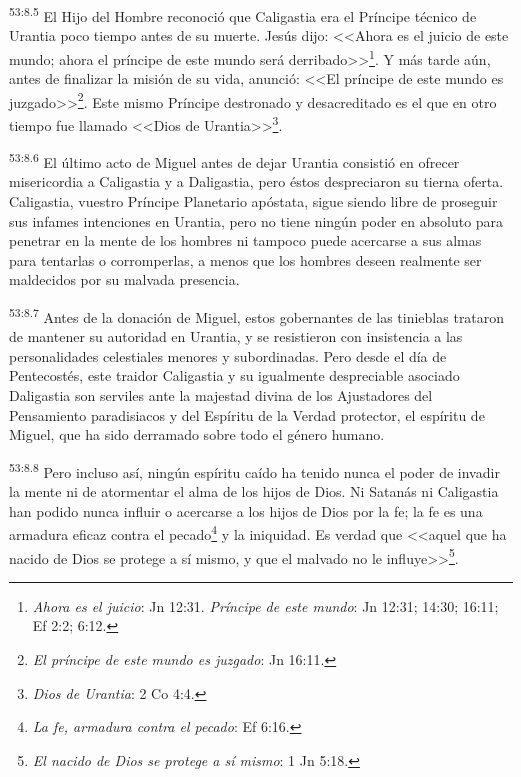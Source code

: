 \par
\textsuperscript{53:8.5} El Hijo del Hombre reconoció que Caligastia era el Príncipe técnico de Urantia poco tiempo antes de su muerte. Jesús dijo: <<Ahora es el juicio de este mundo; ahora el príncipe de este mundo será derribado>>\footnote{\textit{Ahora es el juicio}: Jn 12:31. \textit{Príncipe de este mundo}: Jn 12:31; 14:30; 16:11; Ef 2:2; 6:12.}. Y más tarde aún, antes de finalizar la misión de su vida, anunció: <<El príncipe de este mundo es juzgado>>\footnote{\textit{El príncipe de este mundo es juzgado}: Jn 16:11.}. Este mismo Príncipe destronado y desacreditado es el que en otro tiempo fue llamado <<Dios de Urantia>>\footnote{\textit{Dios de Urantia}: 2 Co 4:4.}.

\par
\textsuperscript{53:8.6} El último acto de Miguel antes de dejar Urantia consistió en ofrecer misericordia a Caligastia y a Daligastia, pero éstos despreciaron su tierna oferta. Caligastia, vuestro Príncipe Planetario apóstata, sigue siendo libre de proseguir sus infames intenciones en Urantia, pero no tiene ningún poder en absoluto para penetrar en la mente de los hombres ni tampoco puede acercarse a sus almas para tentarlas o corromperlas, a menos que los hombres deseen realmente ser maldecidos por su malvada presencia.

\par
\textsuperscript{53:8.7} Antes de la donación de Miguel, estos gobernantes de las tinieblas trataron de mantener su autoridad en Urantia, y se resistieron con insistencia a las personalidades celestiales menores y subordinadas. Pero desde el día de Pentecostés, este traidor Caligastia y su igualmente despreciable asociado Daligastia son serviles ante la majestad divina de los Ajustadores del Pensamiento paradisiacos y del Espíritu de la Verdad protector, el espíritu de Miguel, que ha sido derramado sobre todo el género humano.

\par
\textsuperscript{53:8.8} Pero incluso así, ningún espíritu caído ha tenido nunca el poder de invadir la mente ni de atormentar el alma de los hijos de Dios. Ni Satanás ni Caligastia han podido nunca influir o acercarse a los hijos de Dios por la fe; la fe es una armadura eficaz contra el pecado\footnote{\textit{La fe, armadura contra el pecado}: Ef 6:16.} y la iniquidad. Es verdad que <<aquel que ha nacido de Dios se protege a sí mismo, y que el malvado no le influye>>\footnote{\textit{El nacido de Dios se protege a sí mismo}: 1 Jn 5:18.}.

